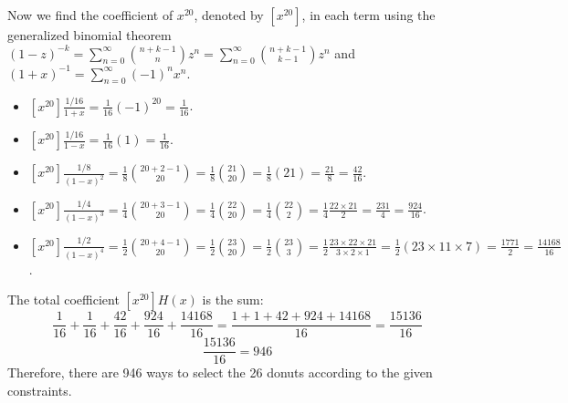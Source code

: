 \documentclass{report}
\begin{document}
{Now we find the coefficient of $x^{20}$, denoted by $[x^{20}]$, in each term using the generalized binomial theorem $(1-z)^{-k} = \sum_{n=0}^\infty \binom{n+k-1}{n} z^n = \sum_{n=0}^\infty \binom{n+k-1}{k-1} z^n$ and $(1+x)^{-1} = \sum_{n=0}^\infty (-1)^n x^n$.
\begin{itemize}
    \item $[x^{20}] \frac{1/16}{1+x} = \frac{1}{16} (-1)^{20} = \frac{1}{16}$.
    \item $[x^{20}] \frac{1/16}{1-x} = \frac{1}{16} (1) = \frac{1}{16}$.
    \item $[x^{20}] \frac{1/8}{(1-x)^2} = \frac{1}{8} \binom{20+2-1}{20} = \frac{1}{8} \binom{21}{20} = \frac{1}{8} (21) = \frac{21}{8} = \frac{42}{16}$.
    \item $[x^{20}] \frac{1/4}{(1-x)^3} = \frac{1}{4} \binom{20+3-1}{20} = \frac{1}{4} \binom{22}{20} = \frac{1}{4} \binom{22}{2} = \frac{1}{4} \frac{22 \times 21}{2} = \frac{231}{4} = \frac{924}{16}$.
    \item $[x^{20}] \frac{1/2}{(1-x)^4} = \frac{1}{2} \binom{20+4-1}{20} = \frac{1}{2} \binom{23}{20} = \frac{1}{2} \binom{23}{3} = \frac{1}{2} \frac{23 \times 22 \times 21}{3 \times 2 \times 1} = \frac{1}{2} (23 \times 11 \times 7) = \frac{1771}{2} = \frac{14168}{16}$.
\end{itemize}
The total coefficient $[x^{20}] H(x)$ is the sum:
\[ \frac{1}{16} + \frac{1}{16} + \frac{42}{16} + \frac{924}{16} + \frac{14168}{16} = \frac{1+1+42+924+14168}{16} = \frac{15136}{16} \]
\[ \frac{15136}{16} = 946 \]
Therefore, there are 946 ways to select the 26 donuts according to the given constraints.
}
\end{document}
